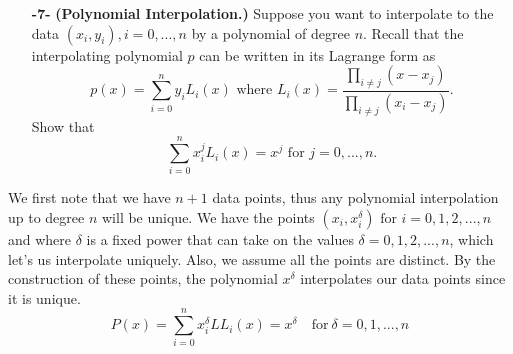 \documentclass[11pt]{article}
\theoremstyle{definition}
\newcommand{\1}[1]{\mathbf{1} \left \{ #1 \right \}}
\begin{document}
\begin{itemize}
    \item[{\textbf{-7-}}] \textbf{(Polynomial Interpolation.)}  Suppose you want to interpolate to the data $(x_i, y_i), i=0,..., n$ by a polynomial of degree $n$.  Recall that the interpolating polynomial $p$ can be written in its Lagrange form as
    \begin{equation}
        p(x) = \sum_{i=0}^n y_i L_i (x) \text{  where  } L_i (x) = \frac{\prod_{i \neq j}(x - x_j)}{\prod_{i \neq j}(x_i - x_j)}.
    \end{equation}
    Show that
    \begin{equation}
        \sum_{i=0}^n x_i^j L_i (x) = x^j \text{  for  } j=0,..., n.
    \end{equation}
\end{itemize}
We first note that we have $n+1$ data points, thus any polynomial interpolation up to degree $n$ will be unique.  We have the points \(\left(x_i , x_i^{\delta}\right) \text{ for } i=0,1,2,...,n\) and where $\delta$ is a fixed power that can take on the values $\delta = 0,1,2,...,n$, which let's us interpolate uniquely.  Also, we assume all the points are distinct.  By the construction of these points, the polynomial $x^{\delta}$ interpolates our data points since it is unique.
\[P(x) = \sum_{i=0}^n x_i^{\delta} LL_i (x) = x^{\delta} \quad \text{for} \ \delta = 0,1,...,n\]
\end{document}
